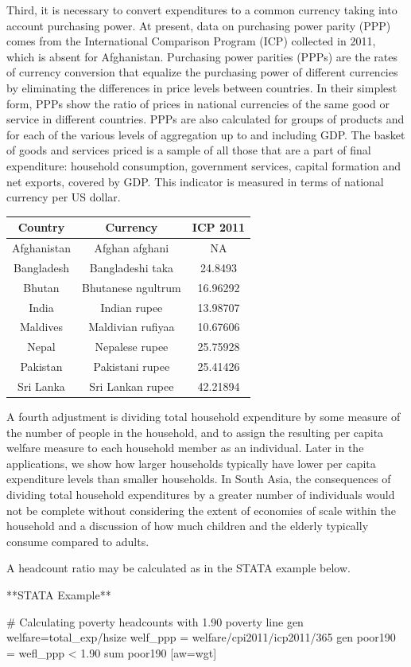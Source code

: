 \documentclass[13 pt,]{book}
\newenvironment{Shaded}{\begin{snugshade}}{\end{snugshade}}
\newcommand{\FunctionTok}[1]{\textcolor[rgb]{0.00,0.00,0.00}{{#1}}}
\newcommand{\NormalTok}[1]{{#1}}
\begin{document}
Third, it is necessary to convert expenditures to a common currency
taking into account purchasing power. At present, data on purchasing
power parity (PPP) comes from the International Comparison Program (ICP)
collected in 2011, which is absent for Afghanistan. Purchasing power
parities (PPPs) are the rates of currency conversion that equalize the
purchasing power of different currencies by eliminating the differences
in price levels between countries. In their simplest form, PPPs show the
ratio of prices in national currencies of the same good or service in
different countries. PPPs are also calculated for groups of products and
for each of the various levels of aggregation up to and including GDP.
The basket of goods and services priced is a sample of all those that
are a part of final expenditure: household consumption, government
services, capital formation and net exports, covered by GDP. This
indicator is measured in terms of national currency per US dollar.

\begin{longtable}[]{@{}ccc@{}}
\toprule
Country & Currency & ICP 2011\tabularnewline
\midrule
\endhead
Afghanistan & Afghan afghani & NA\tabularnewline
Bangladesh & Bangladeshi taka & 24.8493\tabularnewline
Bhutan & Bhutanese ngultrum & 16.96292\tabularnewline
India & Indian rupee & 13.98707\tabularnewline
Maldives & Maldivian rufiyaa & 10.67606\tabularnewline
Nepal & Nepalese rupee & 25.75928\tabularnewline
Pakistan & Pakistani rupee & 25.41426\tabularnewline
Sri Lanka & Sri Lankan rupee & 42.21894\tabularnewline
\bottomrule
\end{longtable}

A fourth adjustment is dividing total household expenditure by some
measure of the number of people in the household, and to assign the
resulting per capita welfare measure to each household member as an
individual. Later in the applications, we show how larger households
typically have lower per capita expenditure levels than smaller
households. In South Asia, the consequences of dividing total household
expenditures by a greater number of individuals would not be complete
without considering the extent of economies of scale within the
household and a discussion of how much children and the elderly
typically consume compared to adults.

A headcount ratio may be calculated as in the STATA example below.

\begin{Shaded}
\begin{Highlighting}[]
\NormalTok{**STATA Example**}

\FunctionTok{# Calculating poverty headcounts with 1.90 poverty line}
\NormalTok{gen welfare=total_exp/hsize}
\NormalTok{welf_ppp = welfare/cpi2011/icp2011/365}
\NormalTok{gen poor190 = wefl_ppp < 1.90}
\NormalTok{sum poor190 [aw=wgt]}
\end{Highlighting}
\end{Shaded}
\end{document}
